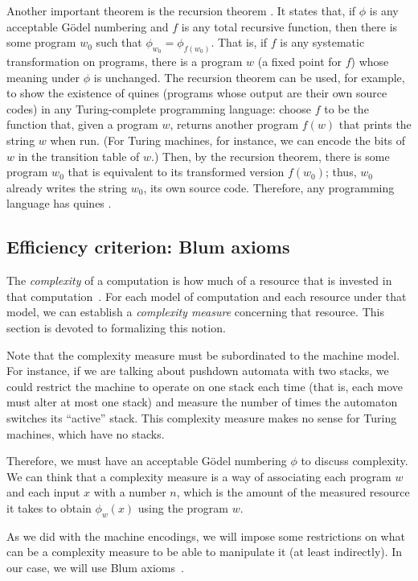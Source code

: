 \documentclass[12pt]{article}
\theoremstyle{definition}
\begin{document}
Another important theorem is the recursion theorem
\cite[p.~181]{Rogers1987}.
It states that, if $\phi$ is any acceptable Gödel numbering
and $f$ is any total recursive function,
then there is some program $w_0$ such that $\phi_{w_0} = \phi_{f(w_0)}$.
That is,
if $f$ is any systematic transformation on programs,
there is a program $w$ (a fixed point for $f$) whose meaning under $\phi$ is unchanged.
The recursion theorem can be used,
for example, to show the existence of quines
(programs whose output are their own source codes)
in any Turing-complete programming language:
choose $f$ to be the function that, given a program $w$,
returns another program $f(w)$ that prints the string $w$ when run.
(For Turing machines, for instance,
we can encode the bits of $w$ in the transition table of $w$.)
Then, by the recursion theorem,
there is some program $w_0$ that is equivalent to its transformed version $f(w_0)$;
thus, $w_0$ already writes the string $w_0$, its own source code.
Therefore, any programming language has quines \cite[p.~227]{Kozen2006}.

\subsection{Efficiency criterion: Blum axioms}
\label{sec:blum-axioms}

The \emph{complexity} of a computation is how much of a resource
that is invested in that computation~\cite[p.~285]{HopcroftUllman1979}.
For each model of computation and each resource under that model,
we can establish a \emph{complexity measure} concerning that resource.
This section is devoted to formalizing this notion.

Note that the complexity measure must be subordinated to the machine model.
For instance,
if we are talking about pushdown automata with two stacks,
we could restrict the machine to operate on one stack each time
(that is, each move must alter at most one stack)
and measure the number of times the automaton switches its ``active'' stack.
This complexity measure makes no sense for Turing machines,
which have no stacks.

Therefore,
we must have an acceptable Gödel numbering $\phi$
to discuss complexity.
We can think that a complexity measure is a way of associating
each program $w$ and each input $x$
with a number $n$,
which is the amount of the measured resource it takes to obtain $\phi_w(x)$
using the program $w$.

As we did with the machine encodings,
we will impose some restrictions on what can be a complexity measure
to be able to manipulate it (at least indirectly).
In our case,
we will use Blum axioms~\cite[p.~324]{Blum1967}.
\end{document}
